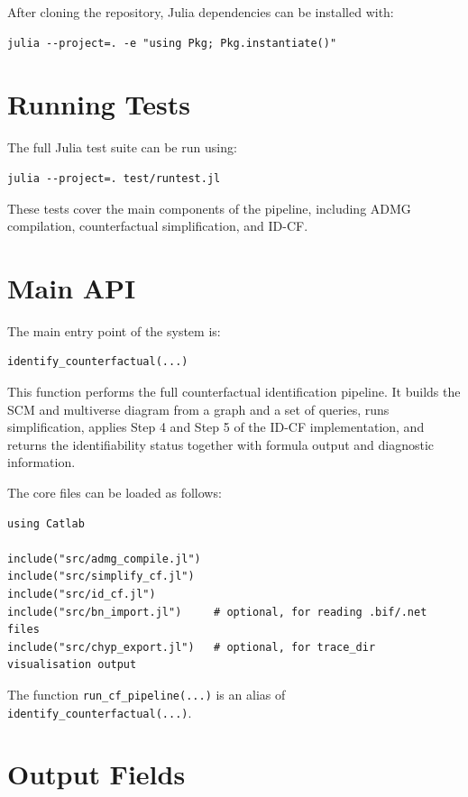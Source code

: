 \documentclass[a4paper]{report}
\begin{document}
After cloning the repository, Julia dependencies can be installed with:

\begin{verbatim}
julia --project=. -e "using Pkg; Pkg.instantiate()"
\end{verbatim}

\section{Running Tests}

The full Julia test suite can be run using:

\begin{verbatim}
julia --project=. test/runtest.jl
\end{verbatim}

These tests cover the main components of the pipeline, including ADMG compilation, counterfactual simplification, and ID-CF.

\section{Main API}

The main entry point of the system is:

\begin{verbatim}
identify_counterfactual(...)
\end{verbatim}

This function performs the full counterfactual identification pipeline. It builds the SCM and multiverse diagram from a graph and a set of queries, runs simplification, applies Step 4 and Step 5 of the ID-CF implementation, and returns the identifiability status together with formula output and diagnostic information.

The core files can be loaded as follows:

\begin{verbatim}
using Catlab

include("src/admg_compile.jl")
include("src/simplify_cf.jl")
include("src/id_cf.jl")
include("src/bn_import.jl")     # optional, for reading .bif/.net files
include("src/chyp_export.jl")   # optional, for trace_dir visualisation output
\end{verbatim}

The function \texttt{run\_cf\_pipeline(...)} is an alias of \texttt{identify\_counterfactual(...)}.

\section{Output Fields}
\end{document}
